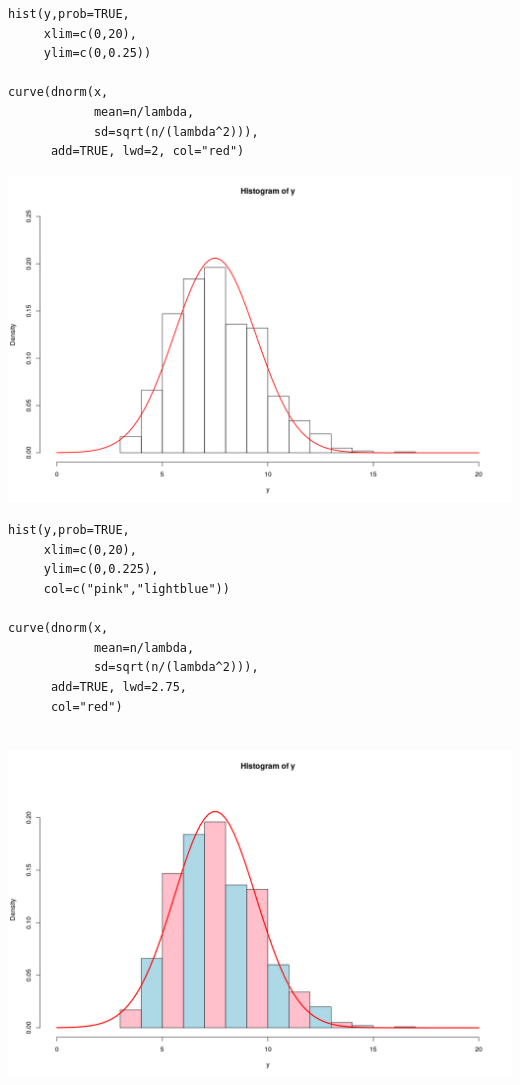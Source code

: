 \documentclass[a4paper,12pt]{article}
\begin{document}
\begin{framed}\begin{verbatim}
hist(y,prob=TRUE,
     xlim=c(0,20),
     ylim=c(0,0.25))

curve(dnorm(x,
            mean=n/lambda,
            sd=sqrt(n/(lambda^2))), 
      add=TRUE, lwd=2, col="red")

\end{verbatim}\end{framed}

\includegraphics[scale=0.6]{00-C1/images/00-C1-Q3-Curve.png}

\newpage

\begin{framed}\begin{verbatim}
hist(y,prob=TRUE,
     xlim=c(0,20),
     ylim=c(0,0.225),
     col=c("pink","lightblue"))

curve(dnorm(x,
            mean=n/lambda,
            sd=sqrt(n/(lambda^2))), 
      add=TRUE, lwd=2.75, 
      col="red")


\end{verbatim}\end{framed}

\includegraphics[scale=0.6]{00-C1/images/00-C1-Q3-Curve-2.png}
\end{document}

